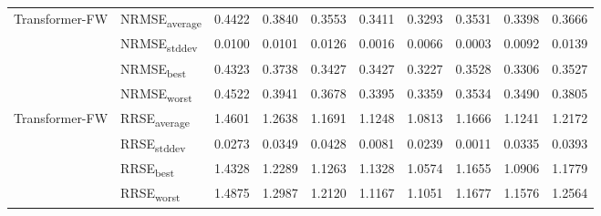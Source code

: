 {\begin{longtable}{l l c c c c c c c c}
\cmidrule(lr){2-10}
\multirow{4}{*}{Transformer-FW} & NRMSE\textsubscript{average} & 0.4422 & 0.3840 & 0.3553 & 0.3411 & 0.3293 & 0.3531 & 0.3398 & 0.3666 \\
 & NRMSE\textsubscript{stddev} & 0.0100 & 0.0101 & 0.0126 & 0.0016 & 0.0066 & 0.0003 & 0.0092 & 0.0139 \\
 & NRMSE\textsubscript{best} & 0.4323 & 0.3738 & 0.3427 & 0.3427 & 0.3227 & 0.3528 & 0.3306 & 0.3527 \\
 & NRMSE\textsubscript{worst} & 0.4522 & 0.3941 & 0.3678 & 0.3395 & 0.3359 & 0.3534 & 0.3490 & 0.3805 \\
\cmidrule(lr){2-10}
\multirow{4}{*}{Transformer-FW} & RRSE\textsubscript{average} & 1.4601 & 1.2638 & 1.1691 & 1.1248 & 1.0813 & 1.1666 & 1.1241 & 1.2172 \\
 & RRSE\textsubscript{stddev} & 0.0273 & 0.0349 & 0.0428 & 0.0081 & 0.0239 & 0.0011 & 0.0335 & 0.0393 \\
 & RRSE\textsubscript{best} & 1.4328 & 1.2289 & 1.1263 & 1.1328 & 1.0574 & 1.1655 & 1.0906 & 1.1779 \\
 & RRSE\textsubscript{worst} & 1.4875 & 1.2987 & 1.2120 & 1.1167 & 1.1051 & 1.1677 & 1.1576 & 1.2564 \\
\cmidrule(lr){2-10}
\end{longtable}
}
